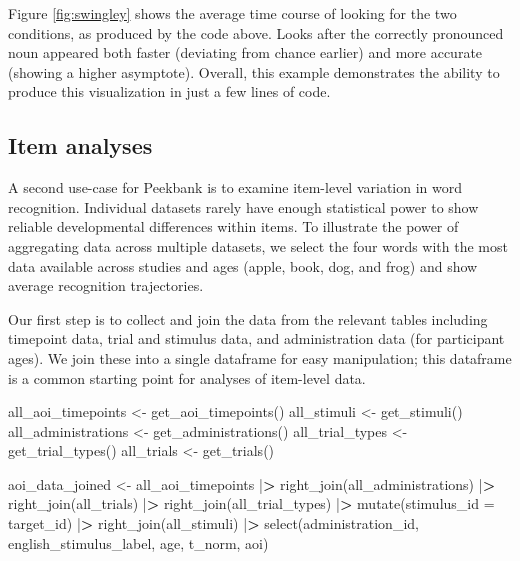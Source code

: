 \documentclass[
  english,
  man,floatsintext]{apa6}
\newenvironment{Shaded}{\begin{snugshade}}{\end{snugshade}}
\newcommand{\AttributeTok}[1]{\textcolor[rgb]{0.77,0.63,0.00}{#1}}
\newcommand{\ErrorTok}[1]{\textcolor[rgb]{0.64,0.00,0.00}{\textbf{#1}}}
\newcommand{\FunctionTok}[1]{\textcolor[rgb]{0.00,0.00,0.00}{#1}}
\newcommand{\NormalTok}[1]{#1}
\newcommand{\OtherTok}[1]{\textcolor[rgb]{0.56,0.35,0.01}{#1}}
\newcommand{\SpecialCharTok}[1]{\textcolor[rgb]{0.00,0.00,0.00}{#1}}
\begin{document}
Figure \ref{fig:swingley} shows the average time course of looking for the two conditions, as produced by the code above. Looks after the correctly pronounced noun appeared both faster (deviating from chance earlier) and more accurate (showing a higher asymptote). Overall, this example demonstrates the ability to produce this visualization in just a few lines of code.

\hypertarget{item-analyses}{%
\subsection{Item analyses}\label{item-analyses}}

A second use-case for Peekbank is to examine item-level variation in word recognition. Individual datasets rarely have enough statistical power to show reliable developmental differences within items. To illustrate the power of aggregating data across multiple datasets, we select the four words with the most data available across studies and ages (apple, book, dog, and frog) and show average recognition trajectories.

Our first step is to collect and join the data from the relevant tables including timepoint data, trial and stimulus data, and administration data (for participant ages). We join these into a single dataframe for easy manipulation; this dataframe is a common starting point for analyses of item-level data.

\begin{Shaded}
\begin{Highlighting}[]
\NormalTok{all\_aoi\_timepoints }\OtherTok{\textless{}{-}} \FunctionTok{get\_aoi\_timepoints}\NormalTok{()}
\NormalTok{all\_stimuli }\OtherTok{\textless{}{-}} \FunctionTok{get\_stimuli}\NormalTok{()}
\NormalTok{all\_administrations }\OtherTok{\textless{}{-}} \FunctionTok{get\_administrations}\NormalTok{()}
\NormalTok{all\_trial\_types }\OtherTok{\textless{}{-}} \FunctionTok{get\_trial\_types}\NormalTok{() }
\NormalTok{all\_trials }\OtherTok{\textless{}{-}} \FunctionTok{get\_trials}\NormalTok{()  }

\NormalTok{aoi\_data\_joined }\OtherTok{\textless{}{-}}\NormalTok{ all\_aoi\_timepoints }\SpecialCharTok{|}\ErrorTok{\textgreater{}}
  \FunctionTok{right\_join}\NormalTok{(all\_administrations) }\SpecialCharTok{|}\ErrorTok{\textgreater{}}
  \FunctionTok{right\_join}\NormalTok{(all\_trials) }\SpecialCharTok{|}\ErrorTok{\textgreater{}}
  \FunctionTok{right\_join}\NormalTok{(all\_trial\_types) }\SpecialCharTok{|}\ErrorTok{\textgreater{}}
  \FunctionTok{mutate}\NormalTok{(}\AttributeTok{stimulus\_id =}\NormalTok{ target\_id) }\SpecialCharTok{|}\ErrorTok{\textgreater{}}
  \FunctionTok{right\_join}\NormalTok{(all\_stimuli) }\SpecialCharTok{|}\ErrorTok{\textgreater{}}
  \FunctionTok{select}\NormalTok{(administration\_id, english\_stimulus\_label, age, t\_norm, aoi)}
\end{Highlighting}
\end{Shaded}
\end{document}
